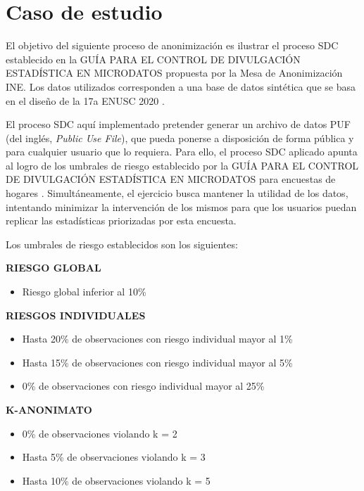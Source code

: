 \documentclass[]{book}
\providecommand{\tightlist}{%
  \setlength{\itemsep}{0pt}\setlength{\parskip}{0pt}}
\theoremstyle{definition}
\theoremstyle{definition}
\theoremstyle{definition}
\theoremstyle{definition}
\theoremstyle{remark}
\begin{document}
\hypertarget{caso-de-estudio}{%
\chapter{Caso de estudio}\label{caso-de-estudio}}

El objetivo del siguiente proceso de anonimización es ilustrar el proceso SDC establecido en la GUÍA PARA EL CONTROL DE DIVULGACIÓN ESTADÍSTICA EN MICRODATOS propuesta por la Mesa de Anonimización INE. Los datos utilizados corresponden a una base de datos sintética que se basa en el diseño de la 17a ENUSC 2020 \citep{manualbdenusc}.

El proceso SDC aquí implementado pretender generar un archivo de datos PUF (del inglés, \emph{Public Use File}), que pueda ponerse a disposición de forma pública y para cualquier usuario que lo requiera. Para ello, el proceso SDC aplicado apunta al logro de los umbrales de riesgo establecido por la GUÍA PARA EL CONTROL DE DIVULGACIÓN ESTADÍSTICA EN MICRODATOS para encuestas de hogares \citep{manualsdcine}. Simultáneamente, el ejercicio busca mantener la utilidad de los datos, intentando minimizar la intervención de los mismos para que los usuarios puedan replicar las estadísticas priorizadas por esta encuesta.

Los umbrales de riesgo establecidos son los siguientes:

\textbf{RIESGO GLOBAL}

\begin{itemize}
\tightlist
\item
  Riesgo global inferior al 10\%
\end{itemize}

\textbf{RIESGOS INDIVIDUALES}

\begin{itemize}
\tightlist
\item
  Hasta 20\% de observaciones con riesgo individual mayor al 1\%
\item
  Hasta 15\% de observaciones con riesgo individual mayor al 5\%
\item
  0\% de observaciones con riesgo individual mayor al 25\%
\end{itemize}

\textbf{K-ANONIMATO}

\begin{itemize}
\tightlist
\item
  0\% de observaciones violando k = 2
\item
  Hasta 5\% de observaciones violando k = 3
\item
  Hasta 10\% de observaciones violando k = 5
\end{itemize}
\end{document}
